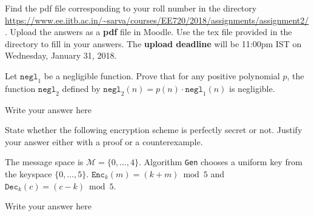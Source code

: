 \documentclass[12pt,a4paper,answers]{exam}
\begin{document}
\pagestyle{head}
\headrule
{}
%

\extraheadheight{.4in}%
\extrafootheight{-0.5in}%
\extrawidth{0.5in}%

Find the pdf file corresponding to your roll number in the directory \url{https://www.ee.iitb.ac.in/~sarva/courses/EE720/2018/assignments/assignment2/}. Upload the answers as a \textbf{pdf} file in Moodle. Use the tex file provided in the directory to fill in your answers. The \textbf{upload deadline} will be 11:00pm IST on Wednesday, January 31, 2018.
\begin{questions}
\question[5] Let $\texttt{negl}_1$ be a negligible function. Prove that for any positive polynomial $p$, the function $\texttt{negl}_2$ defined by $\texttt{negl}_2(n) = p(n) \cdot \texttt{negl}_1(n)$ is negligible.
  \begin{solution}
    Write your answer here
  \end{solution}
 
\question[5] State whether the following encryption scheme is perfectly secret or not. Justify your answer either with a proof or a counterexample.

  The message space is $\mathcal{M} = \{0,\ldots,4\}$. Algorithm \texttt{Gen} chooses a uniform key from the keyspace $\{0,\ldots,5\}$. $\texttt{Enc}_k(m) = (k+m) \bmod 5$ and $\texttt{Dec}_k(c) = (c-k) \bmod 5$.
  \begin{solution}
    Write your answer here
  \end{solution}

  
\end{questions}
\end{document}
